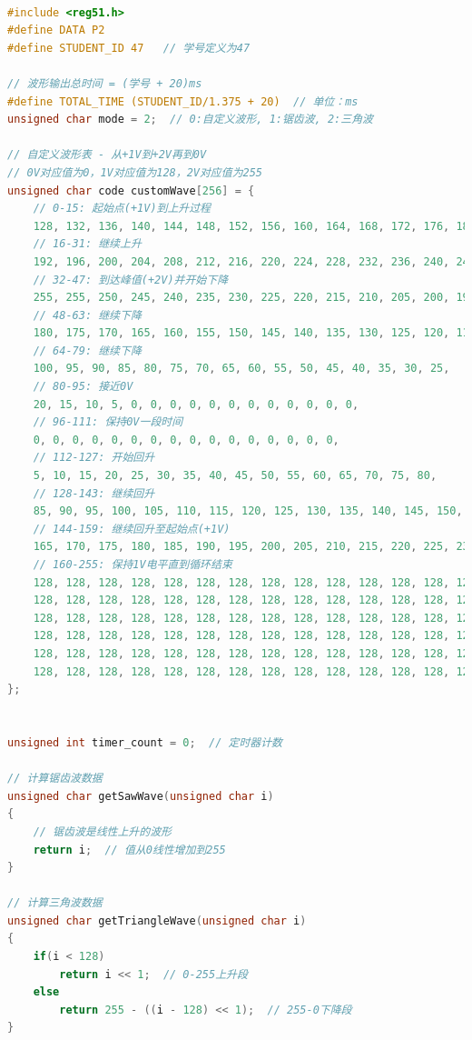 \documentclass[12pt,hyperref,a4paper,UTF8]{ctexart}
\begin{document}
\begin{lstlisting}[language=C, caption={实验程序}]

#include <reg51.h>
#define DATA P2
#define STUDENT_ID 47   // 学号定义为47

// 波形输出总时间 = (学号 + 20)ms
#define TOTAL_TIME (STUDENT_ID/1.375 + 20)  // 单位：ms
unsigned char mode = 2;  // 0:自定义波形, 1:锯齿波, 2:三角波

// 自定义波形表 - 从+1V到+2V再到0V
// 0V对应值为0，1V对应值为128，2V对应值为255
unsigned char code customWave[256] = {
    // 0-15: 起始点(+1V)到上升过程
    128, 132, 136, 140, 144, 148, 152, 156, 160, 164, 168, 172, 176, 180, 184, 188,
    // 16-31: 继续上升
    192, 196, 200, 204, 208, 212, 216, 220, 224, 228, 232, 236, 240, 244, 248, 252,
    // 32-47: 到达峰值(+2V)并开始下降
    255, 255, 250, 245, 240, 235, 230, 225, 220, 215, 210, 205, 200, 195, 190, 185,
    // 48-63: 继续下降
    180, 175, 170, 165, 160, 155, 150, 145, 140, 135, 130, 125, 120, 115, 110, 105,
    // 64-79: 继续下降
    100, 95, 90, 85, 80, 75, 70, 65, 60, 55, 50, 45, 40, 35, 30, 25,
    // 80-95: 接近0V
    20, 15, 10, 5, 0, 0, 0, 0, 0, 0, 0, 0, 0, 0, 0, 0,
    // 96-111: 保持0V一段时间
    0, 0, 0, 0, 0, 0, 0, 0, 0, 0, 0, 0, 0, 0, 0, 0,
    // 112-127: 开始回升
    5, 10, 15, 20, 25, 30, 35, 40, 45, 50, 55, 60, 65, 70, 75, 80,
    // 128-143: 继续回升
    85, 90, 95, 100, 105, 110, 115, 120, 125, 130, 135, 140, 145, 150, 155, 160,
    // 144-159: 继续回升至起始点(+1V)
    165, 170, 175, 180, 185, 190, 195, 200, 205, 210, 215, 220, 225, 230, 235, 240,
    // 160-255: 保持1V电平直到循环结束
    128, 128, 128, 128, 128, 128, 128, 128, 128, 128, 128, 128, 128, 128, 128, 128,
    128, 128, 128, 128, 128, 128, 128, 128, 128, 128, 128, 128, 128, 128, 128, 128,
    128, 128, 128, 128, 128, 128, 128, 128, 128, 128, 128, 128, 128, 128, 128, 128,
    128, 128, 128, 128, 128, 128, 128, 128, 128, 128, 128, 128, 128, 128, 128, 128,
    128, 128, 128, 128, 128, 128, 128, 128, 128, 128, 128, 128, 128, 128, 128, 128,
    128, 128, 128, 128, 128, 128, 128, 128, 128, 128, 128, 128, 128, 128, 128, 128
};


unsigned int timer_count = 0;  // 定时器计数

// 计算锯齿波数据
unsigned char getSawWave(unsigned char i)
{
    // 锯齿波是线性上升的波形
    return i;  // 值从0线性增加到255
}

// 计算三角波数据
unsigned char getTriangleWave(unsigned char i)
{
    if(i < 128)
        return i << 1;  // 0-255上升段
    else
        return 255 - ((i - 128) << 1);  // 255-0下降段
}


\end{lstlisting}
\end{document}
